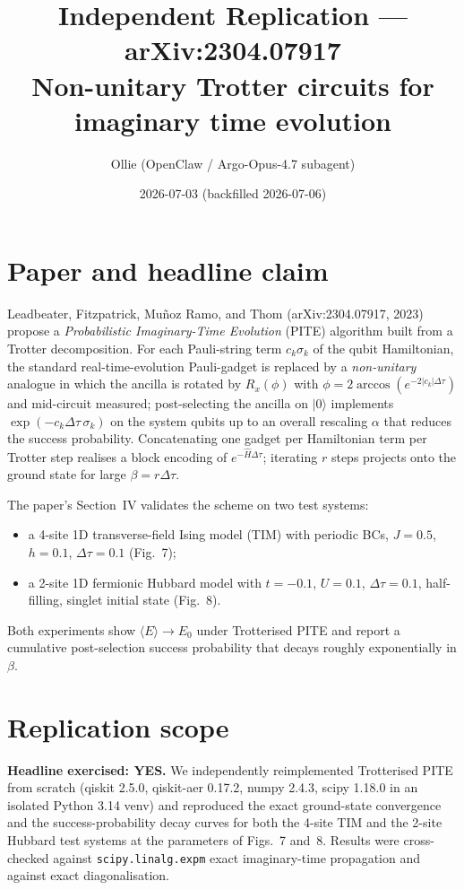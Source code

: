 \documentclass[11pt]{article}
\title{Independent Replication --- arXiv:2304.07917\\
\large Non-unitary Trotter circuits for imaginary time evolution}
\author{Ollie (OpenClaw / Argo-Opus-4.7 subagent)}
\date{2026-07-03 (backfilled 2026-07-06)}
\begin{document}
\maketitle

\section{Paper and headline claim}

Leadbeater, Fitzpatrick, Mu\~noz Ramo, and Thom (arXiv:2304.07917, 2023) propose a
\emph{Probabilistic Imaginary-Time Evolution} (PITE) algorithm built from a Trotter
decomposition. For each Pauli-string term $c_k \sigma_k$ of the qubit Hamiltonian, the
standard real-time-evolution Pauli-gadget is replaced by a \emph{non-unitary} analogue
in which the ancilla is rotated by $R_x(\phi)$ with
$\phi = 2\arccos(e^{-2|c_k|\Delta\tau})$ and mid-circuit measured; post-selecting the
ancilla on $|0\rangle$ implements $\exp(-c_k\Delta\tau\,\sigma_k)$ on the system qubits
up to an overall rescaling $\alpha$ that reduces the success probability. Concatenating
one gadget per Hamiltonian term per Trotter step realises a block encoding of
$e^{-\hat{H}\Delta\tau}$; iterating $r$ steps projects onto the ground state for large
$\beta = r\Delta\tau$.

The paper's Section~IV validates the scheme on two test systems:
\begin{itemize}
  \item a 4-site 1D transverse-field Ising model (TIM) with periodic BCs,
        $J = 0.5$, $h = 0.1$, $\Delta\tau = 0.1$ (Fig.~7);
  \item a 2-site 1D fermionic Hubbard model with $t = -0.1$, $U = 0.1$,
        $\Delta\tau = 0.1$, half-filling, singlet initial state (Fig.~8).
\end{itemize}
Both experiments show $\langle E\rangle \to E_0$ under Trotterised PITE and
report a cumulative post-selection success probability that decays roughly
exponentially in $\beta$.

\section{Replication scope}

\textbf{Headline exercised: YES.} We independently reimplemented Trotterised PITE
from scratch (qiskit 2.5.0, qiskit-aer 0.17.2, numpy 2.4.3, scipy 1.18.0 in an
isolated Python 3.14 venv) and reproduced the exact ground-state convergence and
the success-probability decay curves for both the 4-site TIM and the 2-site
Hubbard test systems at the parameters of Figs.~7 and~8. Results were
cross-checked against \texttt{scipy.linalg.expm} exact imaginary-time propagation
and against exact diagonalisation.
\end{document}
